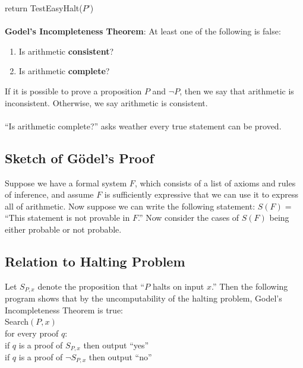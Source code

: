 \documentclass{article}
\theoremstyle{definition}
\begin{document}
return TestEasyHalt($P’$) \\ \\
\textbf{Godel’s Incompleteness Theorem}: At least one of the following is false: \begin{enumerate}
\item Is arithmetic \textbf{consistent}? 
\item Is arithmetic \textbf{complete}?
\end{enumerate} $ $ \\
If it is possible to prove a proposition $P$ and $\neg P$, then we say that arithmetic is inconsistent. Otherwise, we say arithmetic is consistent. \\ \\
``Is arithmetic complete?'' asks weather every true statement can be proved.
\subsection*{Sketch of Gödel’s Proof}
Suppose we have a formal system $F$, which consists of a list of axioms and rules of inference, and assume $F$ is sufficiently expressive that we can use it to express all of arithmetic.
Now suppose we can write the following statement: $S(F) =$ ``This statement is not provable in $F$.'' Now consider the cases of $S(F)$ being either probable or not probable.
\subsection*{Relation to Halting Problem}
Let $S_{P, x}$ denote the proposition that ``$P$ halts on input $x$.'' Then the following program shows that by the uncomputability of the halting problem, Godel's Incompleteness Theorem is true: \\
Search$(P, x)$ \\
for every proof $q$: \\
if $q$ is a proof of $S_{P,x}$ then output ``yes'' \\
if $q$ is a proof of $\neg S_{P,x}$ then output ``no''
\end{document}
